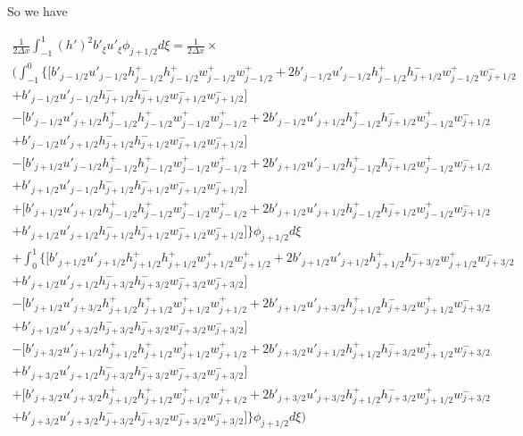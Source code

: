 \documentclass[12pt]{article}
\begin{document}
So we have

\begin{multline}
\frac{1}{2\Delta x}\int_{-1}^{1} {(h')^2}b'_{\xi} u'_{\xi} \phi_{j+1/2} d\xi =  \frac{1}{2\Delta x} \times\\ \bigg( \int_{-1}^{0}\bigg\lbrace \bigg[b'_{j-1/2}u'_{j-1/2} h^+_{j-1/2}h^+_{j-1/2} w^+_{j-1/2}w^+_{j-1/2}  + 2b'_{j-1/2}u'_{j-1/2}h^+_{j-1/2}h^-_{j+1/2} w^+_{j-1/2} w^-_{j+1/2} \\+ b'_{j-1/2}u'_{j-1/2}h^-_{j+1/2}h^-_{j+1/2} w^-_{j+1/2}w^-_{j+1/2}\bigg] \\- \bigg[ b'_{j-1/2}u'_{j+1/2}h^+_{j-1/2}h^+_{j-1/2} w^+_{j-1/2}w^+_{j-1/2}  + 2b'_{j-1/2}u'_{j+1/2}h^+_{j-1/2}h^-_{j+1/2} w^+_{j-1/2} w^-_{j+1/2} \\ + b'_{j-1/2}u'_{j+1/2}h^-_{j+1/2}h^-_{j+1/2} w^-_{j+1/2}w^-_{j+1/2}\bigg] \\- \bigg[ b'_{j+1/2} u'_{j-1/2}h^+_{j-1/2}h^+_{j-1/2} w^+_{j-1/2}w^+_{j-1/2}  + 2b'_{j+1/2} u'_{j-1/2}h^+_{j-1/2}h^-_{j+1/2} w^+_{j-1/2} w^-_{j+1/2} \\+ b'_{j+1/2} u'_{j-1/2}h^-_{j+1/2}h^-_{j+1/2} w^-_{j+1/2}w^-_{j+1/2}\bigg]\\+ \bigg[ b'_{j+1/2}u'_{j+1/2}h^+_{j-1/2}h^+_{j-1/2} w^+_{j-1/2}w^+_{j-1/2}  + 2b'_{j+1/2}u'_{j+1/2}h^+_{j-1/2}h^-_{j+1/2} w^+_{j-1/2} w^-_{j+1/2} \\+ b'_{j+1/2}u'_{j+1/2}h^-_{j+1/2}h^-_{j+1/2} w^-_{j+1/2}w^-_{j+1/2}\bigg] \bigg\rbrace \phi_{j+1/2} d\xi\\
+ \int_{0}^{1} \bigg\lbrace \bigg[b'_{j+1/2}u'_{j+1/2} h^+_{j+1/2}h^+_{j+1/2} w^+_{j+1/2}w^+_{j+1/2}+ 2b'_{j+1/2}u'_{j+1/2} h^+_{j+1/2}h^-_{j+3/2} w^+_{j+1/2} w^-_{j+3/2} \\+ b'_{j+1/2}u'_{j+1/2} h^-_{j+3/2}h^-_{j+3/2} w^-_{j+3/2}w^-_{j+3/2}\bigg] \\- \bigg[b'_{j+1/2}u'_{j+3/2}h^+_{j+1/2}h^+_{j+1/2} w^+_{j+1/2}w^+_{j+1/2}+ 2b'_{j+1/2}u'_{j+3/2}h^+_{j+1/2}h^-_{j+3/2} w^+_{j+1/2} w^-_{j+3/2} \\+ b'_{j+1/2}u'_{j+3/2}h^-_{j+3/2}h^-_{j+3/2} w^-_{j+3/2}w^-_{j+3/2}\bigg] \\- \bigg[b'_{j+3/2} u'_{j+1/2}h^+_{j+1/2}h^+_{j+1/2} w^+_{j+1/2}w^+_{j+1/2}+ 2b'_{j+3/2} u'_{j+1/2}h^+_{j+1/2}h^-_{j+3/2} w^+_{j+1/2} w^-_{j+3/2} \\+ b'_{j+3/2} u'_{j+1/2}h^-_{j+3/2}h^-_{j+3/2} w^-_{j+3/2}w^-_{j+3/2}\bigg] \\+ \bigg[b'_{j+3/2} u'_{j+3/2}h^+_{j+1/2}h^+_{j+1/2} w^+_{j+1/2}w^+_{j+1/2}+ 2b'_{j+3/2} u'_{j+3/2}h^+_{j+1/2}h^-_{j+3/2} w^+_{j+1/2} w^-_{j+3/2} \\+ b'_{j+3/2} u'_{j+3/2}h^-_{j+3/2}h^-_{j+3/2} w^-_{j+3/2}w^-_{j+3/2}\bigg] \bigg\rbrace \phi_{j+1/2} d\xi\bigg)
\end{multline}
\end{document}

